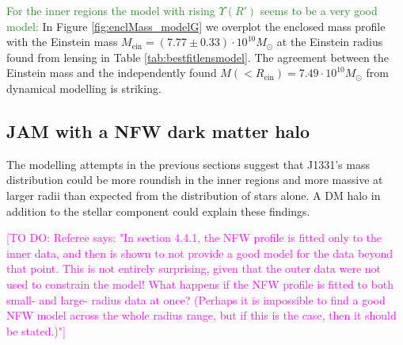 \documentclass[useAMS,usenatbib]{mnras}
\newcommand{\Wilma}[1]{\textcolor{Magenta}{#1}}
\newcommand{\NEW}[1]{\textcolor{ForestGreen}{#1}}
\begin{document}
\NEW{For the inner regions the model with rising $\Upsilon(R')$ seems to be a very good model:} In Figure \ref{fig:enclMass_modelG} we overplot the enclosed mass profile with the Einstein mass $M_\text{ein} = (7.77 \pm 0.33) \cdot 10^{10} M_\odot$ at the Einstein radius found from lensing in Table \ref{tab:bestfitlensmodel}. The agreement between the Einstein mass and the independently found $M(<R_\text{ein}) = 7.49 \cdot 10^{10} M_\odot$ from dynamical modelling is striking.

\subsection{JAM with a NFW dark matter halo} \label{sec:results_JAM_NFW}

The modelling attempts in the previous sections suggest that J1331's mass distribution could be more roundish in the inner regions and more massive at larger radii than expected from the distribution of stars alone. A DM halo in addition to the stellar component could explain these findings. 

\Wilma{[TO DO: Referee says: "In section 4.4.1, the NFW profile is fitted only to the inner data, and then is
shown to not provide a good model for the data beyond that point. This is not
entirely surprising, given that the outer data were not used to constrain the model!
What happens if the NFW profile is fitted to both small- and large- radius data at
once? (Perhaps it is impossible to find a good NFW model across the whole radius
range, but if this is the case, then it should be stated.)"]}
\end{document}
